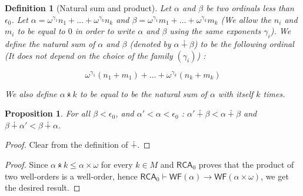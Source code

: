 \documentclass{article}
\numberwithin{theorem}{section}
\newtheorem{lemma}[theorem]{Lemma}
\newtheorem{proposition}[theorem]{Proposition}
\newtheorem{definition}[theorem]{Definition}
\newcommand{\RCA}{\mathsf{RCA}}
\newcommand{\BSig}{\mathsf{B}\Sigma^0}
\newcommand{\WF}{\mathsf{WF}}
\newcommand{\RT}{\mathsf{RT}}
\newcommand{\M}{\mathcal{M}}
\newcommand{\nplus}{\dotplus}
\newcommand{\ntimes}{\dottimes}
\begin{document}
\begin{definition}[Natural sum and product]
Let $\alpha$ and $\beta$ be two ordinals less than $\epsilon_0$. Let $\alpha = \omega^{\gamma_1}n_1 + \dots + \omega^{\gamma_k}n_k$ and $\beta = \omega^{\gamma_1}m_1 + \dots + \omega^{\gamma_k}m_k$ (We allow the $n_i$ and $m_i$ to be equal to $0$ in order to write $\alpha$ and $\beta$ using the same exponents $\gamma_i$). We define the natural sum of $\alpha$ and $\beta$ (denoted by $\alpha \nplus \beta$) to be the following ordinal (It does not depend on the choice of the family $(\gamma_i)$) : 

$$\omega^{\gamma_1}(n_1 + m_1) + \dots + \omega^{\gamma_k}(n_k + m_k)$$

We also define $\alpha \ntimes k$ to be equal to be the natural sum of $\alpha$ with itself $k$ times. %
\end{definition}

\begin{proposition}
For all $\beta < \epsilon_0$, and $\alpha' < \alpha < \epsilon_0$ : $\alpha' \nplus \beta < \alpha \nplus \beta$ and $\beta \nplus \alpha' < \beta \nplus \alpha$.
\end{proposition}

\begin{proof}
Clear from the definition of $\nplus$.
\end{proof}


\begin{proof}
Since $\alpha \ntimes k \leq \alpha \times \omega$ for every $k \in M$ and $\RCA_0$ proves that the product of two well-orders is a well-order, hence $\RCA_0 \vdash \WF(\alpha) \rightarrow \WF(\alpha \times \omega)$, we get the desired result.



\end{proof}
\end{document}
